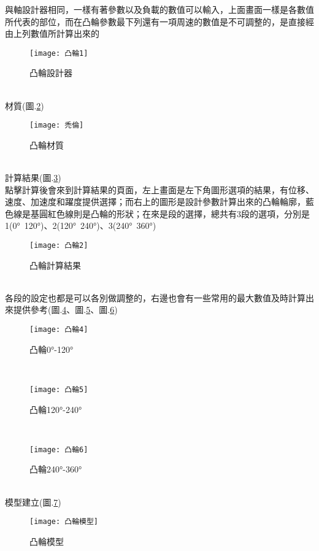 \begin{itemize}
		\qquad 與軸設計器相同，一樣有著參數以及負載的數值可以輸入，上面畫面一樣是各數值所代表的部位，而在凸輪參數最下列還有一項周速的數值是不可調整的，是直接經由上列數值所計算出來的
		\begin{figure}[hbt!]
		\begin{center}
		\texttt{[image: 凸輪1]}
		\caption{\Large 凸輪設計器}\label{2.11}
		\end{center}
		\end{figure}
		\\
		材質(圖.\ref{2.12})
		\begin{figure}[hbt!]
		\begin{center}
		\texttt{[image: 禿倫]}
		\caption{\Large 凸輪材質}\label{2.12}
		\end{center}
		\end{figure}
		\\
		計算結果(圖.\ref{2.13})\\
		
		\qquad 點擊計算後會來到計算結果的頁面，左上畫面是左下角圖形選項的結果，有位移、速度、加速度和躍度提供選擇；而右上的圖形是設計參數計算出來的凸輪輪廓，藍色線是基圓紅色線則是凸輪的形狀；在來是段的選擇，總共有3段的選項，分別是1(0°~120°)、2(120°~240°)、3(240°~360°)
		\begin{figure}[hbt!]
		\begin{center}
		\texttt{[image: 凸輪2]}
		\caption{\Large 凸輪計算結果}\label{2.13}
		\end{center}
		\end{figure}
		\\
		
		\qquad 各段的設定也都是可以各別做調整的，右邊也會有一些常用的最大數值及時計算出來提供參考(圖.\ref{2.14}、圖.\ref{2.15}、圖.\ref{2.16})
		\begin{figure}[hbt!]
		\begin{center}
		\texttt{[image: 凸輪4]}
		\caption{\Large 凸輪0°-120°}\label{2.14}
		\end{center}
		\end{figure}
		\\
		\begin{figure}[hbt!]
		\begin{center}
		\texttt{[image: 凸輪5]}
		\caption{\Large 凸輪120°-240°}\label{2.15}
		\end{center}
		\end{figure}
		\\
		\begin{figure}[hbt!]
		\begin{center}
		\texttt{[image: 凸輪6]}
		\caption{\Large 凸輪240°-360°}\label{2.16}
		\end{center}
		\end{figure}
		\\
		模型建立(圖.\ref{2.17})
		\begin{figure}[hbt!]
		\begin{center}
		\texttt{[image: 凸輪模型]}
		\caption{\Large 凸輪模型}\label{2.17}
		\end{center}
		\end{figure}
		\\
		

\end{itemize}
